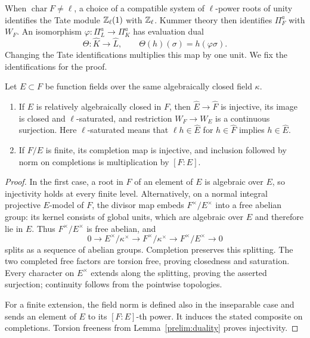 When $\operatorname{char}F\ne\ell$, a choice of a compatible system of
$\ell$-power roots of unity identifies the Tate module $\mathbb Z_\ell(1)$ with
$\mathbb Z_\ell$.  Kummer theory then identifies $\Pi_F^a$ with $W_F$.
An isomorphism $\varphi:\Pi_L^a\to\Pi_K^a$ has evaluation dual
\begin{equation}\label{eq:theta}
 \Theta:\widehat K\longrightarrow\widehat L,
 \qquad \Theta(h)(\sigma)=h(\varphi\sigma).
\end{equation}
Changing the Tate identifications multiplies this map by one unit.
We fix the identifications for the proof.

\begin{lemma}\label{prelim:completion}
Let $E\subset F$ be function fields over the same algebraically closed
field $\kappa$.
\begin{enumerate}
\item If $E$ is relatively algebraically closed in $F$, then
$\widehat E\to\widehat F$ is injective, its image is closed and
$\ell$-saturated, and restriction $W_F\to W_E$ is a continuous
surjection.  Here $\ell$-saturated means that $\ell h\in\widehat E$
for $h\in\widehat F$ implies $h\in\widehat E$.
\item If $F/E$ is finite, its completion map is injective, and
inclusion followed by norm on completions is multiplication by
$[F:E]$.
\end{enumerate}
\end{lemma}
\begin{proof}
In the first case, a root in $F$ of an element of $E$ is algebraic over
$E$, so injectivity holds at every finite level.  Alternatively, on a
normal integral projective $E$-model of $F$, the divisor map embeds
$F^\times/E^\times$ into a free abelian group: its kernel consists of
global units, which are algebraic over $E$ and therefore lie in $E$.
Thus $F^\times/E^\times$ is free abelian, and
\[
 0\longrightarrow E^\times/\kappa^\times
 \longrightarrow F^\times/\kappa^\times
 \longrightarrow F^\times/E^\times\longrightarrow0
\]
splits as a sequence of abelian groups.  Completion preserves this
splitting.  The two completed free factors are torsion free, proving
closedness and saturation.  Every character on $E^\times$ extends along
the splitting, proving the asserted surjection; continuity follows from
the pointwise topologies.

For a finite extension, the field norm is defined also in the inseparable
case and sends an element of $E$ to its $[F:E]$-th power.  It induces
the stated composite on completions.  Torsion freeness from
Lemma~\ref{prelim:duality} proves injectivity.
\end{proof}

